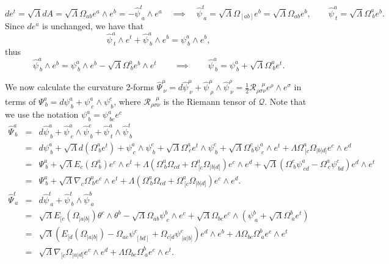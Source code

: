 \[
{d}e^{t}=\sqrt{\Lambda}{d}A=\sqrt{\Lambda}\Omega_{ab}e^{a}\wedge e^{b}=-\hat{\psi}_{\ a}^{t}\wedge e^{a}\quad\implies\quad\hat{\psi}_{\ a}^{t}=\sqrt{\Lambda}\Omega_{[ab]}e^{b}=\sqrt{\Lambda}\Omega_{ab}e^{b},\qquad\hat{\psi}_{\ t}^{a}=\sqrt{\Lambda}\Omega_{\ b}^{a}e^{b}.
\]
Since ${d}e^{a}$ is unchanged, we have that
\[
\hat{\psi}_{\ t}^{a}\wedge e^{t}+\hat{\psi}_{\ b}^{a}\wedge e^{b}=\psi_{\ b}^{a}\wedge e^{b},
\]
thus
\[
\hat{\psi}_{\ b}^{a}\wedge e^{b}=\psi_{\ b}^{a}\wedge e^{b}-\sqrt{\Lambda}\Omega_{\ b}^{a}e^{b}\wedge e^{t}\qquad\implies\qquad\hat{\psi}_{\ b}^{a}=\psi_{\ b}^{a}+\sqrt{\Lambda}\Omega_{\ b}^{a}e^{t}.
\]


We now calculate the curvature 2-forms $\hat{\Psi}_{\ \nu}^{\mu}={d}\hat{\psi}_{\ \nu}^{\mu}+\hat{\psi}_{\ \rho}^{\mu}\wedge\hat{\psi}_{\ \nu}^{\rho}=\frac{1}{2}\mathcal{R}_{\rho\sigma\nu}^{\ \ \ \ \mu}e^{\rho}\wedge e^{\sigma}$
in terms of $\Psi_{\ b}^{a}={d}\psi_{\ b}^{a}+\psi_{\ c}^{a}\wedge\psi_{\ b}^{c}$,
where $\mathcal{R}_{\rho\sigma\nu}^{\ \ \ \ \mu}$ is the Riemann
tensor of $\mathcal{Q}$. Note that we use the notation $\psi_{\ b}^{a}=\psi_{\ bc}^{a}e^{c}$
\begin{eqnarray*}
\hat{\Psi}_{\ b}^{a} & = & {d}\hat{\psi}_{\ b}^{a}+\hat{\psi}_{\ c}^{a}\wedge\hat{\psi}_{\ b}^{c}+\hat{\psi}_{\ t}^{a}\wedge\hat{\psi}_{\ b}^{t}\\
 & = & {d}\psi_{\ b}^{a}+{\sqrt{\Lambda}{d}}(\Omega_{\ b}^{a}e^{t})+\psi_{\ c}^{a}\wedge\psi_{\ b}^{c}+\sqrt{\Lambda}\Omega_{\ c}^{a}e^{t}\wedge\psi_{\ b}^{c}+\sqrt{\Lambda}\Omega_{\ b}^{c}\psi_{\ c}^{a}\wedge e^{t}+\Lambda\Omega_{\ [c}^{a}\Omega_{|b|d]}e^{c}\wedge e^{d}\\
 & = & \Psi_{\ b}^{a}+\sqrt{\Lambda}E_{c}(\Omega_{\ b}^{a})e^{c}\wedge e^{t}+\Lambda(\Omega_{\ b}^{a}\Omega_{cd}+\Omega_{\ [c}^{a}\Omega_{|b|d]})e^{c}\wedge e^{d}+\sqrt{\Lambda}(\Omega_{\ b}^{c}\psi_{\ cd}^{a}-\Omega_{\ c}^{a}\psi_{\ bd}^{c})e^{d}\wedge e^{t}\\
 & = & \Psi_{\ b}^{a}+\sqrt{\Lambda}\nabla_{c}\Omega_{\ b}^{a}e^{c}\wedge e^{t}+\Lambda(\Omega_{\ b}^{a}\Omega_{cd}+\Omega_{\ [c}^{a}\Omega_{|b|d]})e^{c}\wedge e^{d}.\\
\hat{\Psi}_{\ a}^{t} & = & {d}\hat{\psi}_{\ a}^{t}+\hat{\psi}_{\ b}^{t}\wedge\hat{\psi}_{\ a}^{b}\\
 & = & \sqrt{\Lambda}E_{[c}(\Omega_{|a|b]})\theta^{c}\wedge\theta^{b}-\sqrt{\Lambda}\Omega_{ab}\psi_{\ c}^{b}\wedge e^{c}+\sqrt{\Lambda}\Omega_{bc}e^{c}\wedge(\psi_{\ a}^{b}+\sqrt{\Lambda}\Omega_{\ a}^{b}e^{t})\\
 & = & \sqrt{\Lambda}(E_{[d}(\Omega_{|a|b]})-\Omega_{ac}\psi_{\ [bd]}^{c}+\Omega_{c[d}\psi_{\ |a|b]}^{c})e^{d}\wedge e^{b}+\Lambda\Omega_{bc}\Omega_{\ a}^{b}e^{c}\wedge e^{t}\\
 & = & \sqrt{\Lambda}\nabla_{[c}\Omega_{|a|d]}e^{c}\wedge e^{d}+\Lambda\Omega_{bc}\Omega_{\ a}^{b}e^{c}\wedge e^{t}.
\end{eqnarray*}
